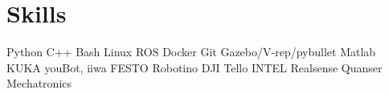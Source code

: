 \documentclass[]{deedy-resume-openfont}
\begin{document}
\begin{minipage}[t]{0.32\textwidth}




\section{Skills}
Python\textbullet{}
C++\textbullet{}
Bash\textbullet{}
Linux\textbullet{}
ROS\textbullet{}
Docker\textbullet{}
Git\textbullet{}
Gazebo/V-rep/pybullet\textbullet{}
Matlab\textbullet{}
KUKA youBot, iiwa\textbullet{}
FESTO Robotino\textbullet{} DJI Tello\textbullet{} INTEL Realsense\textbullet{} Quanser Mechatronics
\sectionsep


\end{minipage}
\end{document}
